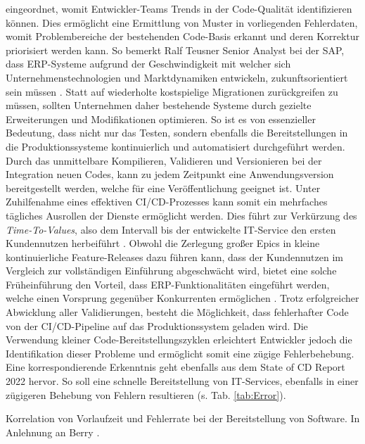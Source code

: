 eingeordnet, womit Entwickler-Teams Trends in der Code-Qualität identifizieren können. Dies ermöglicht eine Ermittlung von Muster in vorliegenden Fehlerdaten, womit Problembereiche der bestehenden Code-Basis erkannt und deren Korrektur priorisiert werden kann. So bemerkt Ralf Teusner Senior Analyst bei der SAP, dass ERP-Systeme aufgrund der Geschwindigkeit mit welcher sich Unternehmenstechnologien und Marktdynamiken entwickeln, zukunftsorientiert sein müssen \cite{.20230419c}. Statt auf wiederholte kostspielige Migrationen zurückgreifen zu müssen, sollten Unternehmen daher bestehende Systeme durch gezielte Erweiterungen und Modifikationen optimieren. So ist es von essenzieller Bedeutung, dass nicht nur das Testen, sondern ebenfalls die Bereitstellungen in die Produktionssysteme kontinuierlich und automatisiert durchgeführt werden. Durch das unmittelbare Kompilieren, Validieren und Versionieren bei der Integration neuen Codes, kann zu jedem Zeitpunkt eine Anwendungsversion bereitgestellt werden, welche für eine Veröffentlichung geeignet ist. Unter Zuhilfenahme eines effektiven CI/CD-Prozesses kann somit ein mehrfaches tägliches Ausrollen der Dienste ermöglicht werden. Dies führt zur Verkürzung des \textit{Time-To-Values}, also dem Intervall bis der entwickelte IT-Service den ersten Kundennutzen herbeiführt \cite{Prof.Dr.RalfT.Kreutzer.20180215}. Obwohl die Zerlegung großer Epics in kleine kontinuierliche Feature-Releases dazu führen kann, dass der Kundennutzen im Vergleich zur vollständigen Einführung abgeschwächt wird, bietet eine solche Früheinführung den Vorteil, dass ERP-Funktionalitäten eingeführt werden, welche einen Vorsprung gegenüber Konkurrenten ermöglichen \cite[9]{Halstenberg.2020}. Trotz erfolgreicher Abwicklung aller Validierungen, besteht die Möglichkeit, dass fehlerhafter Code von der CI/CD-Pipeline auf das Produktionssystem geladen wird. Die Verwendung kleiner Code-Bereitstellungszyklen erleichtert Entwickler jedoch die Identifikation dieser Probleme und ermöglicht somit eine zügige Fehlerbehebung. Eine korrespondierende Erkenntnis geht ebenfalls aus dem State of CD Report 2022 hervor. So soll eine schnelle Bereitstellung von IT-Services, ebenfalls in einer zügigeren Behebung von Fehlern resultieren (s. Tab. \ref{tab:Error}). 
\begin{center}
	\begin{table}[H]
		\centering
		\caption[Korrelation von Vorlaufzeit und Fehlerrate bei der Bereitstellung von Software]{Korrelation von Vorlaufzeit und Fehlerrate bei der Bereitstellung von Software. In Anlehnung an Berry \cite{Berry.20220725}.}
		\label{tab:Error}
	\end{table}
\end{center}
